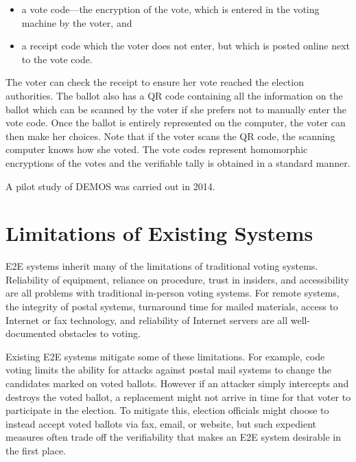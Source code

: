 \begin{itemize}
\item a vote code---the encryption of the vote, which is entered in
  the voting machine by the voter, and
\item a receipt code which the voter does not enter, but which is
  posted online next to the vote code.
\end{itemize}

The voter can check the receipt to ensure her vote reached the
election authorities. The ballot also has a QR code containing all the
information on the ballot which can be scanned by the voter if she
prefers not to manually enter the vote code. Once the ballot is
entirely represented on the computer, the voter can then make her
choices. Note that if the voter scans the QR code, the scanning
computer knows how she voted. The vote codes represent homomorphic
encryptions of the votes and the verifiable tally is obtained in a
standard manner.

A pilot study of DEMOS was carried out in 2014.


\section{Limitations of Existing Systems}
\label{sec:limit-exist-syst}

E2E systems inherit many of the limitations of traditional voting
systems. Reliability of equipment, reliance on procedure, trust in
insiders, and accessibility are all problems with traditional
in-person voting systems. For remote systems, the integrity of postal
systems, turnaround time for mailed materials, access to Internet or
fax technology, and reliability of Internet servers are all
well-documented obstacles to voting. 

Existing E2E systems mitigate some of these limitations. For example,
code voting limits the ability for attacks against postal mail systems
to change the candidates marked on voted ballots. However if an
attacker simply intercepts and destroys the voted ballot, a
replacement might not arrive in time for that voter to participate in
the election. To mitigate this, election officials might choose to
instead accept voted ballots via fax, email, or website, but such
expedient measures often trade off the verifiability that makes an E2E
system desirable in the first place.

